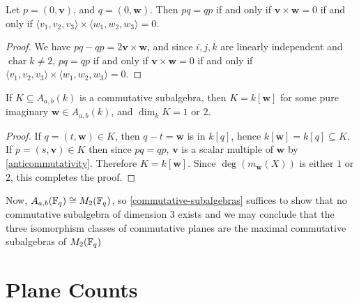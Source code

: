 \documentclass{amsart}
\begin{document}
\begin{lemma}\label{anticommutativity}
    Let $p = (0, \mathbf{v})$, and $q = (0, \mathbf{w})$. Then $pq = qp$ if and only if $\mathbf{v} \times \mathbf{w} = 0$ if and only if $\langle v_1, v_2, v_3 \rangle \times \langle w_1, w_2, w_3 \rangle = 0$.
\end{lemma}
\begin{proof}
    We have $pq - qp = 2 \mathbf{v} \times \mathbf{w}$, and since $i, j, k$ are linearly independent and $\operatorname{char} k \neq 2$, $pq = qp$ if and only if $\mathbf{v} \times \mathbf{w} = 0$ if and only if $\langle v_1, v_2, v_3 \rangle \times \langle w_1, w_2, w_3 \rangle = 0$.
\end{proof}

\begin{theorem}\label{commutative-subalgebras}
    If $K \subseteq A_{a,b}(k)$ is a commutative subalgebra, then $K = k[\mathbf{w}]$ for some pure imaginary $\mathbf{w} \in A_{a,b}(k)$, and $\dim_k K = 1$ or $2$.
\end{theorem}
\begin{proof}
    If $q = (t, \mathbf{w}) \in K$, then $q-t = \mathbf{w}$ is in $k[q]$, hence $k[\mathbf{w}] = k[q] \subseteq K$. If $p = (s, \mathbf{v}) \in K$ then since $pq = qp$, $\mathbf{v}$ is a scalar multiple of $\mathbf{w}$ by \cref{anticommutativity}. Therefore $K = k[\mathbf{w}]$. Since $\deg(m_{\mathbf{w}}(X))$ is either $1$ or $2$, this completes the proof. 
\end{proof}

Now, $A_{a,b}(\protect\mathbb{F}_q) \cong M_2(\protect\mathbb{F}_q)$, so \cref{commutative-subalgebras} suffices to show that no commutative subalgebra of dimension 3 exists and we may conclude that the three isomorphism classes of commutative planes are the maximal commutative subalgebras of $M_2(\protect\mathbb{F}_q)$





\section{Plane Counts}
\end{document}
